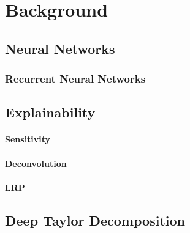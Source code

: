 \chapter{Background\label{cha:chapter3}}

\section{Neural Networks}


\subsection{Recurrent Neural Networks}

\section{Explainability}
\subsubsection{Sensitivity}
\subsubsection{Deconvolution}
\subsubsection{LRP}

\section{Deep Taylor Decomposition}

